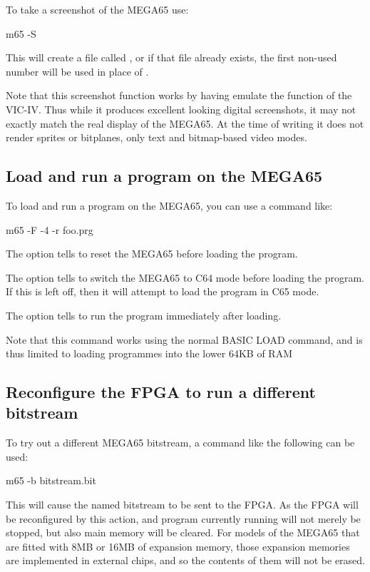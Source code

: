 To take a screenshot of the MEGA65 use:

\begin{screenoutput}
m65 -S
\end{screenoutput}

This will create a file called ,
or if that file already exists, the first non-used number will be used
in place of .

Note that this screenshot function works by having  emulate the
function of the VIC-IV. Thus while it produces excellent looking
digital screenshots, it may not exactly match the real display of the
MEGA65.  At the time of writing it does not render sprites or
bitplanes, only text and bitmap-based video modes.

\subsection{Load and run a program on the MEGA65}

To load and run a program on the MEGA65, you can use a command like:

\begin{screenoutput}
m65 -F -4 -r foo.prg
\end{screenoutput}

The  option tells  to reset the MEGA65
before loading the program.

The  option tells  to switch the MEGA65
to C64 mode before loading the program. If this is left off, then it
will attempt to load the program in C65 mode.

The  option tells  to run the program
immediately after loading.

Note that this command works using the normal BASIC LOAD command, and
is thus limited to loading programmes into the lower 64KB of RAM

\subsection{Reconfigure the FPGA to run a different bitstream}

To try out a different MEGA65 bitstream, a command like the following can be
used:

\begin{screenoutput}
m65 -b bitstream.bit
\end{screenoutput}

This will cause the named bitstream to be sent to the FPGA.  As the
FPGA will be reconfigured by this action, and program currently
running will not merely be stopped, but also main memory will be
cleared. For models of the MEGA65 that are fitted with 8MB or 16MB of
expansion memory, those expansion memories are implemented in external
chips, and so the contents of them will not be erased.

